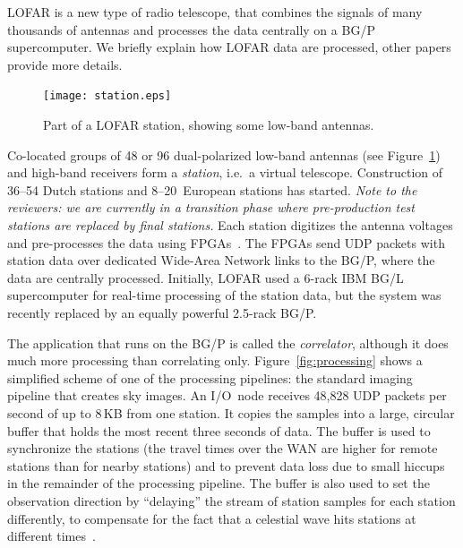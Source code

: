 \documentclass[journal]{IEEEtran}
\begin{document}
LOFAR is a new type of radio telescope, that combines the signals of many
thousands of antennas and processes the data centrally on a BG/P supercomputer.
We briefly explain how LOFAR data are processed, other papers provide more
details\cite{Romein:06,Iskra:08}.


\addtocounter{figure}{-2}
\begin{figure}[h]
\begin{center}
\texttt{[image: station.eps]}
\end{center}
\caption{Part of a LOFAR station, showing some low-band antennas.}
\label{fig:station}
\end{figure}
\addtocounter{figure}{1}

Co-located groups of 48 or 96 dual-polarized low-band antennas (see
Figure~\ref{fig:station}) and high-band receivers form a \emph{station},
i.e.\ a virtual telescope.
Construction of 36--54 Dutch stations and 8--20~European stations has started.
\emph{Note to the reviewers: we are currently in a transition phase
where pre-production test stations are replaced by final stations.}
Each station digitizes the antenna voltages and pre-processes the data using
FPGAs~\cite{Gunst:07}.
The FPGAs send UDP packets with station data over dedicated Wide-Area
Network links to the BG/P, where the data are centrally processed.
Initially, LOFAR used a 6-rack IBM BG/L supercomputer for real-time
processing of the station data, but the system was recently replaced by an
equally powerful 2.5-rack BG/P.

The application that runs on the BG/P is called the \emph{correlator},
although it does much more processing than correlating only.
Figure~\ref{fig:processing} shows a simplified scheme of one of the processing
pipelines: the standard imaging pipeline that creates sky images.
An I/O~node receives 48,828 UDP packets per second of up to 8\,KB from one
station.
It copies the samples into a large, circular buffer that holds the most recent
three seconds of data.
The buffer is used to synchronize the stations (the travel times over the
WAN are higher for remote stations than for nearby stations) and to prevent
data loss due to small hiccups in the remainder of the processing pipeline.
The buffer is also used to set the observation direction by ``delaying''
the stream of station samples for each station differently, to compensate for
the fact that a celestial wave hits stations at different
times~\cite[Sec.~2.1]{Romein:06}.
\end{document}

